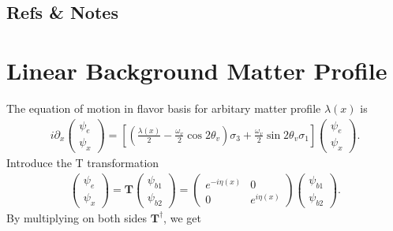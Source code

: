 \documentclass[letterpaper,12pt,english]{sphinxmanual}
\begin{document}
\subsection{Refs \& Notes}
\label{\detokenize{matter-stimulated/picture:refs-notes}}

\section{Linear Background Matter Profile}
\label{\detokenize{matter-stimulated/linear-background-matter::doc}}\label{\detokenize{matter-stimulated/linear-background-matter:linear-background-matter-profile}}
The equation of motion in flavor basis for arbitary matter profile \(\lambda(x)\) is
\begin{equation*}
\begin{split}i \partial_x \begin{pmatrix}
\psi_e\\
\psi_x
\end{pmatrix} = \left[
\left( \frac{\lambda(x)}{2} - \frac{\omega_v}{2} \cos 2\theta_v  \right) \sigma_3 + \frac{\omega_v}{2} \sin 2\theta_v \sigma_1
\right]\begin{pmatrix}
\psi_e\\
\psi_x
\end{pmatrix}.\end{split}
\end{equation*}
Introduce the T transformation
\begin{equation*}
\begin{split}\begin{pmatrix}
\psi_e\\
\psi_x
\end{pmatrix} = \mathbf{T} \begin{pmatrix}
\psi_{b1}\\
\psi_{b2}
\end{pmatrix} = \begin{pmatrix}
e^{-i \eta(x)} & 0 \\
0 & e^{i \eta(x)}
\end{pmatrix} \begin{pmatrix}
\psi_{b1}\\
\psi_{b2}
\end{pmatrix}.\end{split}
\end{equation*}
By multiplying on both sides \(\mathbf{T}^\dagger\), we get
\end{document}
